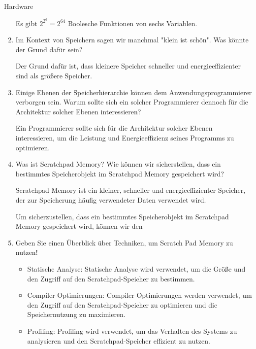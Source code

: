 \documentclass{article}
\begin{document}
\begin{exercise}{Hardware}
\begin{enumerate}
          \begin{solution}
            Es gibt $2^{2^6} = 2^{64}$ Boolesche Funktionen von sechs Variablen.
          \end{solution}

    \item Im Kontext von Speichern sagen wir manchmal "klein ist schön". Was könnte der Grund dafür sein?

          \begin{solution}
            Der Grund dafür ist, dass kleinere Speicher schneller und energieeffizienter sind als größere Speicher.
          \end{solution}

    \item  Einige Ebenen der Speicherhierarchie können dem Anwendungsprogrammierer verborgen sein. Warum sollte sich ein solcher Programmierer dennoch für die Architektur solcher Ebenen interessieren?

          \begin{solution}
            Ein Programmierer sollte sich für die Architektur solcher Ebenen interessieren, um die Leistung und Energieeffizienz seines Programms zu optimieren.
          \end{solution}

    \item Was ist Scratchpad Memory? Wie können wir sicherstellen, dass ein bestimmtes Speicherobjekt im Scratchpad Memory gespeichert wird?

          \begin{solution}
            Scratchpad Memory ist ein kleiner, schneller und energieeffizienter Speicher, der zur Speicherung häufig verwendeter Daten verwendet wird.

            Um sicherzustellen, dass ein bestimmtes Speicherobjekt im Scratchpad Memory gespeichert wird, können wir den
          \end{solution}

    \item Geben Sie einen Überblick über Techniken, um Scratch Pad Memory zu nutzen!

          \begin{solution}
            \begin{itemize}
              \item Statische Analyse: Statische Analyse wird verwendet, um die Größe und den Zugriff auf den Scratchpad-Speicher zu bestimmen.
              \item Compiler-Optimierungen: Compiler-Optimierungen werden verwendet, um den Zugriff auf den Scratchpad-Speicher zu optimieren und die Speichernutzung zu maximieren.
              \item Profiling: Profiling wird verwendet, um das Verhalten des Systems zu analysieren und den Scratchpad-Speicher effizient zu nutzen.
            \end{itemize}
          \end{solution}


\end{enumerate}
\end{exercise}
\end{document}
